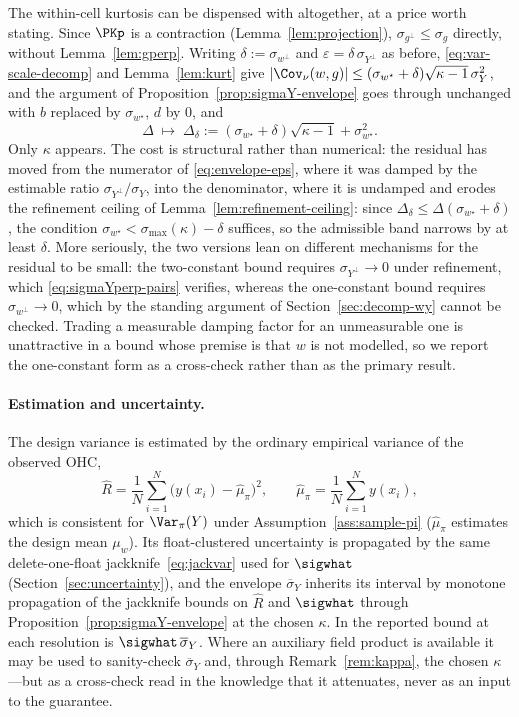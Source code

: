 \begin{remark}
\label{rem:one-constant}
The within-cell kurtosis can be dispensed with altogether, at a price
worth stating. Since $\PKp$ is a contraction
(Lemma~\ref{lem:projection}), $\sigma_{g^{\perp}}\le\sigma_g$ directly,
without Lemma~\ref{lem:gperp}. Writing $\delta:=\sigma_{w^{\perp}}$ and
$\varepsilon=\delta\,\sigma_{Y^{\perp}}$ as before,
\eqref{eq:var-scale-decomp} and Lemma~\ref{lem:kurt} give
$|\Cov_\nu(w,g)|\le(\sigma_{w^{\star}}+\delta)\sqrt{\kappa-1}\,\sigma_Y^2$,
and the argument of Proposition~\ref{prop:sigmaY-envelope} goes through
unchanged with $b$ replaced by $\sigma_{w^{\star}}$, $d$ by $0$, and
\[
  \Delta\;\longmapsto\;
  \Delta_\delta:=(\sigma_{w^{\star}}+\delta)\sqrt{\kappa-1}
    +\sigma_{w^{\star}}^2 .
\]
Only $\kappa$ appears. The cost is structural rather than numerical: the
residual has moved from the numerator of \eqref{eq:envelope-eps}, where
it was damped by the estimable ratio
$\sigma_{Y^{\perp}}/\sigma_Y$, into the denominator, where it is
undamped and erodes the refinement ceiling of
Lemma~\ref{lem:refinement-ceiling}: since
$\Delta_\delta\le\Delta(\sigma_{w^{\star}}+\delta)$, the condition
$\sigma_{w^{\star}}<\sigma_{\max}(\kappa)-\delta$ suffices, so the
admissible band narrows by at least $\delta$. More seriously, the two versions lean on
different mechanisms for the residual to be small: the two-constant bound
requires $\sigma_{Y^{\perp}}\to0$ under refinement, which
\eqref{eq:sigmaYperp-pairs} verifies, whereas the one-constant bound
requires $\sigma_{w^{\perp}}\to0$, which by the standing argument of
Section~\ref{sec:decomp-wy} cannot be checked. Trading a measurable
damping factor for an unmeasurable one is unattractive in a bound whose
premise is that $w$ is not modelled, so we report the one-constant form
as a cross-check rather than as the primary result.
\end{remark}

\paragraph{Estimation and uncertainty.} The design variance is estimated
by the ordinary empirical variance of the observed OHC,
\[
  \hat R=\frac1N\sum_{i=1}^{N}\big(y(x_i)-\hat\mu_\pi\big)^2 ,
  \qquad
  \hat\mu_\pi=\frac1N\sum_{i=1}^{N}y(x_i),
\]
which is consistent for $\Var_\pi(Y)$ under
Assumption~\ref{ass:sample-pi} ($\hat\mu_\pi$ estimates the design mean
$\mu_w$). Its float-clustered uncertainty is propagated by the same
delete-one-float jackknife~\eqref{eq:jackvar} used for $\sigwhat$
(Section~\ref{sec:uncertainty}), and the envelope
$\overline{\sigma}_Y$ inherits its interval by monotone propagation of
the jackknife bounds on $\hat R$ and $\sigwhat$ through
Proposition~\ref{prop:sigmaY-envelope} at the chosen $\kappa$. In the
reported bound at each resolution is
$\sigwhat\,\overline{\sigma}_Y$. Where an auxiliary field product is
available it may be used to sanity-check $\overline{\sigma}_Y$ and,
through Remark~\ref{rem:kappa}, the chosen $\kappa$---but as a
cross-check read in the knowledge that it attenuates, never as an input
to the guarantee.


